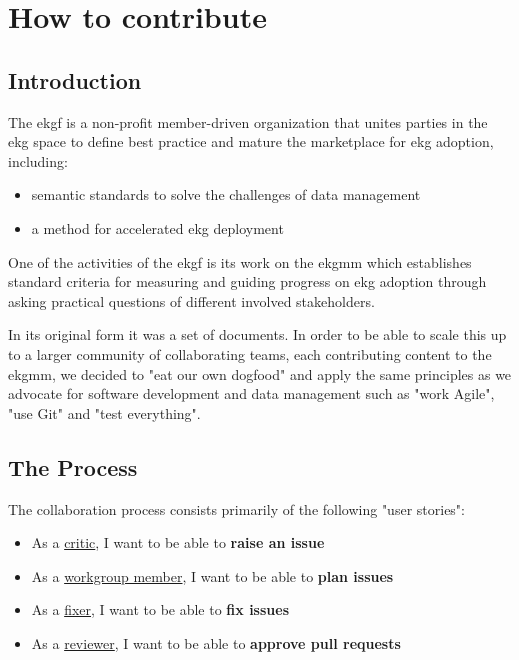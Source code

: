 \chapter{How to contribute}

\section{Introduction}

The \gls{ekgf} is a non-profit member-driven organization that unites parties
in the \gls{ekg} space to define best practice and mature the marketplace for
\gls{ekg} adoption, including:

\begin{itemize}
    \item semantic standards to solve the challenges of data management 
    \item a method for accelerated \gls{ekg} deployment
\end{itemize}

One of the activities of the \gls{ekgf} is its work on the \gls{ekgmm}
which establishes standard criteria for measuring and guiding progress
on \gls{ekg} adoption through asking practical questions of different
involved stakeholders. 

In its original form it was a set of documents. 
In order to be able to scale this up to a larger community of collaborating teams, 
each contributing content to the \gls{ekgmm}, we decided to "eat our own dogfood" 
and apply the same principles as we advocate for software development and 
data management such as "work Agile", "use Git" 
and "test everything".

\section{The Process}

The collaboration process consists primarily of the following "user stories":

\begin{tcolorbox}[colback=secondary!5,colframe=secondary!80,title=\textbf{User Stories}]
    \begin{itemize}[leftmargin=1em]
        \item As a \underline{critic}, I want to be able to \textbf{raise an issue}
        \item As a \underline{workgroup member}, I want to be able to \textbf{plan issues}
        \item As a \underline{fixer}, I want to be able to \textbf{fix issues}
        \item As a \underline{reviewer}, I want to be able to \textbf{approve pull requests}
    \end{itemize}
\end{tcolorbox}

